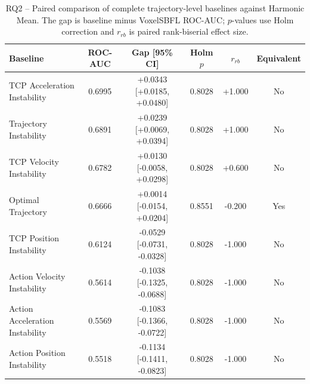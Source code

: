 \begin{table}[t]
\centering
\caption{RQ2 -- Paired comparison of complete trajectory-level baselines against Harmonic Mean. The gap is baseline minus VoxelSBFL ROC-AUC; $p$-values use Holm correction and $r_{rb}$ is paired rank-biserial effect size.}
\label{tab:rq2-baseline-statistics}
{\scriptsize
\setlength{\tabcolsep}{4pt}
\begin{tabular}{lccccc}
\toprule
Baseline & ROC-AUC & Gap [95\% CI] & Holm $p$ & $r_{rb}$ & Equivalent \\
\midrule
TCP Acceleration Instability & 0.6995 & +0.0343 [+0.0185, +0.0480] & 0.8028 & +1.000 & No \\
Trajectory Instability & 0.6891 & +0.0239 [+0.0069, +0.0394] & 0.8028 & +1.000 & No \\
TCP Velocity Instability & 0.6782 & +0.0130 [-0.0058, +0.0298] & 0.8028 & +0.600 & No \\
Optimal Trajectory & 0.6666 & +0.0014 [-0.0154, +0.0204] & 0.8551 & -0.200 & Yes \\
TCP Position Instability & 0.6124 & -0.0529 [-0.0731, -0.0328] & 0.8028 & -1.000 & No \\
Action Velocity Instability & 0.5614 & -0.1038 [-0.1325, -0.0688] & 0.8028 & -1.000 & No \\
Action Acceleration Instability & 0.5569 & -0.1083 [-0.1366, -0.0722] & 0.8028 & -1.000 & No \\
Action Position Instability & 0.5518 & -0.1134 [-0.1411, -0.0823] & 0.8028 & -1.000 & No \\
\bottomrule
\end{tabular}
}
\end{table}
